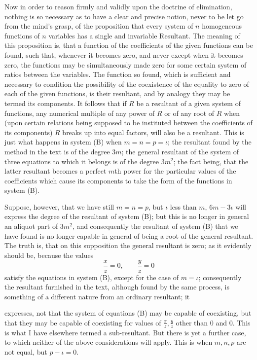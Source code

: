 \documentclass[11pt]{article}
\newcommand{\sourcepage}[1]{\marginpar{\scriptsize p.~#1}}
\begin{document}
{{Now in order to reason firmly and validly upon the doctrine of elimination, nothing is so necessary as to have a clear and precise notion, never to be let go from the mind's grasp, of the proposition that every system of $n$ homogeneous functions of $n$ variables has a single and invariable Resultant. The meaning of this proposition is, that a function of the coefficients of the given functions can be found, such that, whenever it becomes zero, and never except when it becomes zero, the functions may be simultaneously made zero for some certain system of ratios between the variables. The function so found, which is sufficient and necessary to condition the possibility of the coexistence of the equality to zero of each of the given functions, is their resultant, and by analogy they may be termed its components. It follows that if $R$ be a resultant of a given system of functions, any numerical multiple of any power of $R$ or of any root of $R$ when (upon certain relations being supposed to be instituted between the coefficients of its components) $R$ breaks up into equal factors, will also be a resultant. This is just what happens in system (B) when $m=n=p=\iota$; the resultant found by the method in the text is of the degree $3m$; the general resultant of the system of three equations to which it belongs is of the degree $3m^2$; the fact being, that the latter resultant becomes a perfect $m$th power for the particular values of the coefficients which cause its components to take the form of the functions in system (B).

Suppose, however, that we have still $m=n=p$, but $\iota$ less than $m$, $6m-3\iota$ will express the degree of the resultant of system (B); but this is no longer in general an aliquot part of $3m^2$, and consequently the resultant of system (B) that we have found is no longer capable in general of being a root of the general resultant. The truth is, that on this supposition the general resultant is zero; as it evidently should be, because the values
\[
\frac{x}{z}=0,
\qquad
\frac{y}{z}=0
\]
satisfy the equations in system (B), except for the case of $m=\iota$; consequently the resultant furnished in the text, although found by the same process, is something of a different nature from an ordinary resultant; it

\sourcepage{263}
expresses, not that the system of equations (B) may be capable of coexisting, but that they may be capable of coexisting for values of $\frac{x}{z},\frac{y}{z}$ other than $0$ and $0$. This is what I have elsewhere termed a sub-resultant. But there is yet a further case, to which neither of the above considerations will apply. This is when $m,n,p$ are not equal, but $p-\iota=0$.

}}
\end{document}
